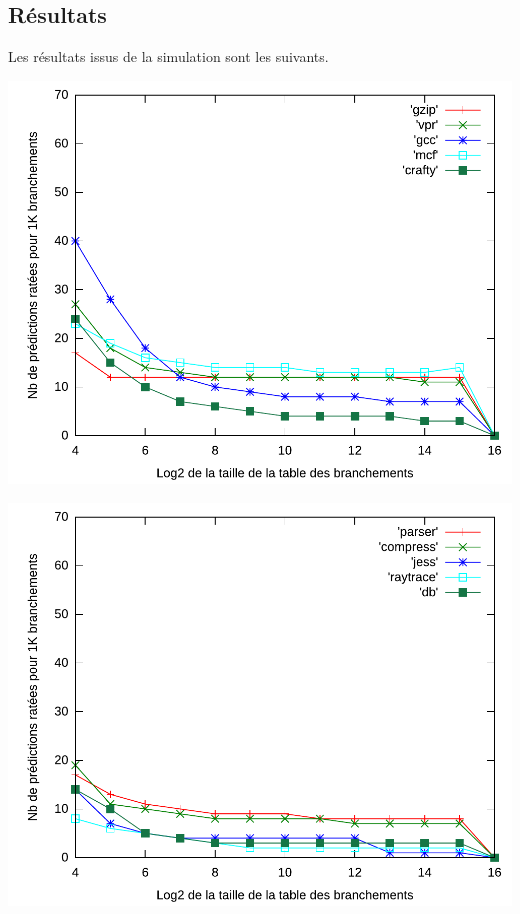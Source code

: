 \documentclass[a4paper]{article}
\begin{document}
\subsection{Résultats}
Les résultats issus de la simulation sont les suivants.
\par
\begin{minipage}{.48\linewidth}
\includegraphics[width=\linewidth]{../figures-correle/correle-0}
\end{minipage}%
\hfill
\begin{minipage}{.48\linewidth}
\includegraphics[width=\linewidth]{../figures-correle/correle-1}
\end{minipage}
\end{document}
